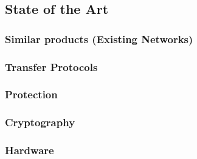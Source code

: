 
\subsection{State of the Art}

\subsubsection{Similar products (Existing Networks)}

\subsubsection{Transfer Protocols}

\subsubsection{Protection}

\subsubsection{Cryptography}

\subsubsection{Hardware}

